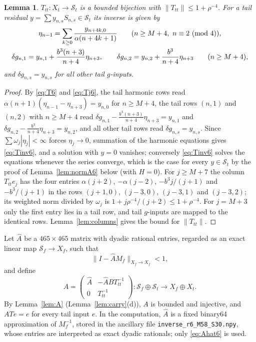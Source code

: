 \documentclass[11pt]{amsart}
\newtheorem{lemma}[theorem]{Lemma}
\theoremstyle{definition}
\theoremstyle{remark}
\numberwithin{equation}{section}
\newcommand{\Sc}{\mathcal{S}}
\newcommand{\nrm}[1]{\lVert #1\rVert}
\begin{document}
\begin{lemma}\label{lem:Ttt6}
$T_{tt}\colon X_t\to\Sc_t$ is a bounded bijection with $\nrm{T_{tt}}\leq1+\rho^{-4}$. For a tail residual $y=\sum y_{n,s}S_{n,s}\in\Sc_t$ its inverse is given by
\begin{gather}
\eta_{n-1}=\sum_{k\geq0}\frac{y_{n+4k,0}}{\alpha(n+4k+1)}\qquad(n\geq M+4,\ n\equiv2\ (\mathrm{mod}\ 4)),\label{eq:Tinv6}\\
\delta g_{n,1}=y_{n,1}+\frac{b^3(n+3)}{n+4}\eta_{n+3},\qquad\delta g_{n,2}=y_{n,2}+\frac{b^3}{n+4}\eta_{n+3}\qquad(n\geq M+4),\notag
\end{gather}
and $\delta g_{n,s}=y_{n,s}$ for all other tail $g$-inputs.
\end{lemma}

\begin{proof}
By \eqref{eq:T6} and \eqref{eq:Tj6}, the tail harmonic rows read $\alpha(n+1)(\eta_{n-1}-\eta_{n+3})=y_{n,0}$ for $n\geq M+4$, the tail rows $(n,1)$ and $(n,2)$ with $n\geq M+4$ read $\delta g_{n,1}-\frac{b^3(n+3)}{n+4}\eta_{n+3}=y_{n,1}$ and $\delta g_{n,2}-\frac{b^3}{n+4}\eta_{n+3}=y_{n,2}$, and all other tail rows read $\delta g_{n,s}=y_{n,s}$. Since $\sum\omega_j|\eta_j|<\infty$ forces $\eta_j\to0$, summation of the harmonic equations gives \eqref{eq:Tinv6}, and a solution with $y=0$ vanishes; conversely \eqref{eq:Tinv6} solves the equations whenever the series converge, which is the case for every $y\in\Sc_t$ by the proof of Lemma~\ref{lem:normA6} below (with $H=0$). For $j\geq M+7$ the column $T_{tt}e_j$ has the four entries $\alpha(j+2)$, $-\alpha(j-2)$, $-b^3j/(j+1)$ and $-b^3/(j+1)$ in the rows $(j+1,0)$, $(j-3,0)$, $(j-3,1)$ and $(j-3,2)$; its weighted norm divided by $\omega_j$ is $1+j\rho^{-4}/(j+2)\leq1+\rho^{-4}$. For $j=M+3$ only the first entry lies in a tail row, and tail $g$-inputs are mapped to the identical rows. Lemma~\ref{lem:columns} gives the bound for $\nrm{T_{tt}}$.
\end{proof}

Let $\widehat A$ be a $465\times465$ matrix with dyadic rational entries, regarded as an exact linear map $\Sc_f\to X_f$, such that
\begin{equation}\label{eq:Ahat6}
\nrm{I-\widehat AM_f}_{X_f\to X_f}<1,
\end{equation}
and define
\begin{equation}\label{eq:A6}
A=\begin{pmatrix}\widehat A&-\widehat ABT_{tt}^{-1}\\0&T_{tt}^{-1}\end{pmatrix}\colon\Sc_f\oplus\Sc_t\to X_f\oplus X_t .
\end{equation}
By Lemma~\ref{lem:A} (Lemma~\ref{lem:carry}(d)), $A$ is bounded and injective, and $ATe=e$ for every tail input $e$. In the computation, $\widehat A$ is a fixed binary64 approximation of $M_f^{-1}$, stored in the ancillary file \texttt{inverse\_r6\_M58\_S30.npy}, whose entries are interpreted as exact dyadic rationals; only \eqref{eq:Ahat6} is used.
\end{document}
